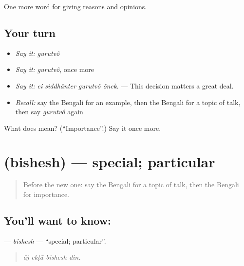 \begin{grammarlens}[title={What you've built}]
One more word for giving reasons and opinions.
\end{grammarlens}

\subsection*{Your turn}
\begin{itemize}
\raggedright
  \item \emph{Say it:} \emph{gurutvô}
  \item \emph{Say it:} \emph{gurutvô}, once more
  \item \emph{Say it:} \emph{ei siddhānter gurutvô ônek.} — This decision matters a great deal.
  \item \emph{Recall:} say the Bengali for an example, then the Bengali for a topic of talk, then say \emph{gurutvô} again
\end{itemize}

\begin{tcolorbox}[breakable,colback=teal!4,colframe=teal!35!black,title={Before you move on}]
What does  mean? (\textquotedblleft{}Importance\textquotedblright{}.) Say it once more.
\end{tcolorbox}
\section[\texorpdfstring{\bn{বিশেষ} (bishesh)}{বিশেষ (bishesh)}]{ (bishesh) — special; particular}

\label{lesson:BN-C336-bishesh}



\begin{quote}
Before the new one: say the Bengali for a topic of talk, then the Bengali for importance.
\end{quote}

\subsection*{You'll want to know: }
\textbf{} — \emph{bishesh} — \textquotedblleft{}special; particular\textquotedblright{}.

\begin{quote}
   
\end{quote}

\begin{quote}
\emph{āj ekṭā bishesh din.}
\end{quote}

